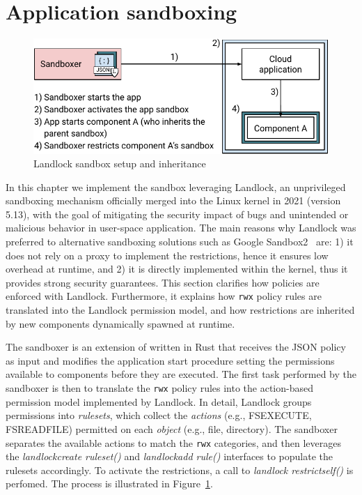 \section{Application sandboxing}\label{sect:sandbox}

\begin{figure}[t!]
  \centering
  \includegraphics[width=0.8\columnwidth]{chapters/dmng/fig/landlock_overview.pdf}
  \caption{Landlock sandbox setup and inheritance}
  \label{fig:landlock}
\end{figure}

In this chapter we implement the sandbox leveraging Landlock, an
unprivileged sandboxing mechanism officially merged into the Linux
kernel in 2021 (version 5.13), with the goal of mitigating the
security impact of bugs and unintended or malicious behavior in
user-space application. The main reasons why Landlock was preferred to
alternative sandboxing solutions such as Google
Sandbox2~\cite{sandbox2} are: 1) it does not rely on a proxy to
implement the restrictions, hence it ensures low overhead at runtime,
and 2) it is directly implemented within the kernel, thus it provides
strong security guarantees. This section clarifies how policies are
enforced with Landlock. Furthermore, it explains how {\tt rwx} policy
rules are translated into the Landlock permission model, and how
restrictions are inherited by new components dynamically spawned at
runtime.

The sandboxer is an extension of \dmng written in Rust that receives
the JSON policy as input and modifies the application start procedure
setting the permissions available to components before they are
executed. The first task performed by the sandboxer is then to
translate the {\tt rwx} policy rules into the action-based permission
model implemented by Landlock. In detail, Landlock groups permissions
into {\em rulesets}, which collect the {\em actions} (e.g.,
FS\textunderscore EXECUTE, FS\textunderscore READ\textunderscore FILE)
permitted on each {\em object} (e.g., file, directory). The sandboxer
separates the available actions to match the {\tt rwx} categories, and
then leverages the {\em landlock\textunderscore create\textunderscore
  ruleset()} and {\em landlock\textunderscore add\textunderscore
  rule()} interfaces to populate the rulesets accordingly. To activate
the restrictions, a call to {\em landlock\textunderscore
  restrict\textunderscore self()} is perfomed. The process is
illustrated in Figure~\ref{fig:landlock}.


